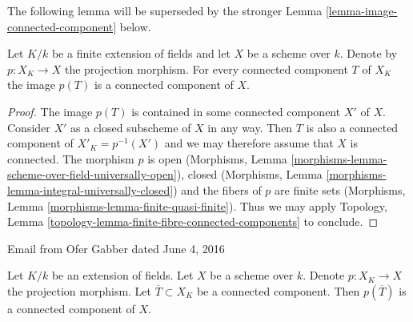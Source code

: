 \noindent
The following lemma will be superseded by the stronger
Lemma \ref{lemma-image-connected-component} below.

\begin{lemma}
\label{lemma-image-connected-component-finite-extension}
Let $K/k$ be a finite extension of fields and let $X$ be a scheme over 
$k$. Denote by $p : X_K \to X$ the projection morphism. For every connected 
component $T$ of $X_K$ the image $p(T)$ is a connected component of 
$X$.
\end{lemma}

\begin{proof}
The image $p(T)$ is contained in some connected component $X'$ of $X$. Consider
$X'$ as a closed subscheme of $X$ in any way. Then $T$ is also a connected
component of $X'_K = p^{-1}(X')$ and we may therefore assume that $X$ is
connected. The morphism $p$ is open
(Morphisms, Lemma \ref{morphisms-lemma-scheme-over-field-universally-open}), 
closed
(Morphisms, Lemma \ref{morphisms-lemma-integral-universally-closed})
and the fibers of $p$ are finite sets
(Morphisms, Lemma \ref{morphisms-lemma-finite-quasi-finite}).
Thus we may apply
Topology, Lemma \ref{topology-lemma-finite-fibre-connected-components}
to conclude.
\end{proof}

\begin{lemma}[Gabber]
\label{lemma-image-connected-component}
\begin{reference}
Email from Ofer Gabber dated June 4, 2016
\end{reference}
Let $K/k$ be an extension of fields. Let $X$ be a scheme over $k$.
Denote $p : X_K \to X$ the projection morphism.
Let $\overline{T} \subset X_K$ be a connected component.
Then $p(\overline{T})$ is a connected component of $X$.
\end{lemma}

